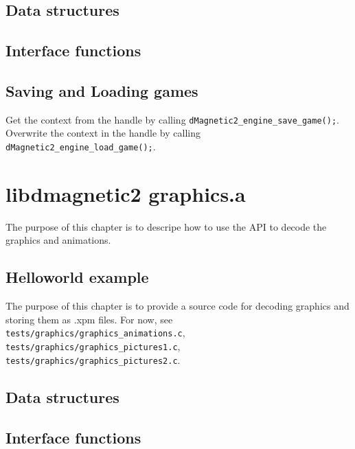\documentclass{report}
\begin{document}
\section{Data structures}
\section{Interface functions}
\section{Saving and Loading games}
Get the context from the handle by calling \verb+dMagnetic2_engine_save_game();+. Overwrite the context in the handle by calling \verb+dMagnetic2_engine_load_game();+.

\chapter{libdmagnetic2 graphics.a}
The purpose of this chapter is to descripe how to use the API to decode the graphics and animations.
\section{Helloworld example}
The purpose of this chapter is to provide a source code for decoding graphics and storing them as .xpm files.
For now, see \verb+tests/graphics/graphics_animations.c+, \verb+tests/graphics/graphics_pictures1.c+, \verb+tests/graphics/graphics_pictures2.c+.
\section{Data structures}
\section{Interface functions}
\end{document}
